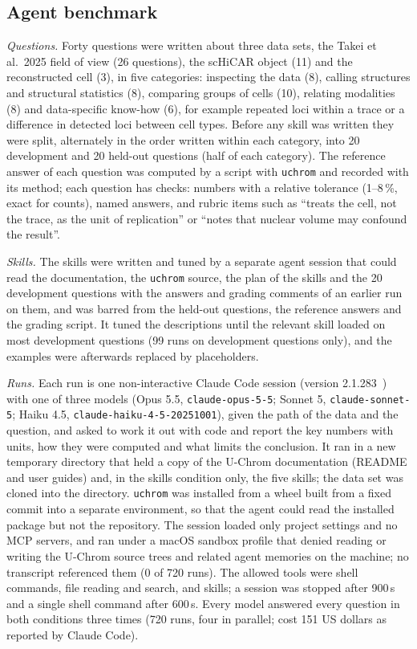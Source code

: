 \documentclass[11pt]{article}
\newcommand{\pkg}[1]{\texttt{#1}}
\begin{document}
\subsection*{Agent benchmark}
\textit{Questions.}
Forty questions were written about three data sets, the Takei et al.\ 2025 field of view (26 questions), the scHiCAR object (11) and the reconstructed cell (3), in five categories: inspecting the data (8), calling structures and structural statistics (8), comparing groups of cells (10), relating modalities (8) and data-specific know-how (6), for example repeated loci within a trace or a difference in detected loci between cell types.
Before any skill was written they were split, alternately in the order written within each category, into 20 development and 20 held-out questions (half of each category).
The reference answer of each question was computed by a script with \pkg{uchrom} and recorded with its method; each question has checks: numbers with a relative tolerance (1--8\,\%, exact for counts), named answers, and rubric items such as ``treats the cell, not the trace, as the unit of replication'' or ``notes that nuclear volume may confound the result''.

\textit{Skills.}
The skills were written and tuned by a separate agent session that could read the documentation, the \pkg{uchrom} source, the plan of the skills and the 20 development questions with the answers and grading comments of an earlier run on them, and was barred from the held-out questions, the reference answers and the grading script.
It tuned the descriptions until the relevant skill loaded on most development questions (99 runs on development questions only), and the examples were afterwards replaced by placeholders.

\textit{Runs.}
Each run is one non-interactive Claude Code session (version 2.1.283~\citep{claudecode}) with one of three models (Opus 5.5, \pkg{claude-opus-5-5}; Sonnet 5, \pkg{claude-sonnet-5}; Haiku 4.5, \pkg{claude-haiku-4-5-20251001}), given the path of the data and the question, and asked to work it out with code and report the key numbers with units, how they were computed and what limits the conclusion.
It ran in a new temporary directory that held a copy of the U-Chrom documentation (README and user guides) and, in the skills condition only, the five skills; the data set was cloned into the directory.
\pkg{uchrom} was installed from a wheel built from a fixed commit into a separate environment, so that the agent could read the installed package but not the repository.
The session loaded only project settings and no MCP servers, and ran under a macOS sandbox profile that denied reading or writing the U-Chrom source trees and related agent memories on the machine; no transcript referenced them (0 of 720 runs).
The allowed tools were shell commands, file reading and search, and skills; a session was stopped after 900\,s and a single shell command after 600\,s.
Every model answered every question in both conditions three times (720 runs, four in parallel; cost 151 US dollars as reported by Claude Code).
\end{document}
